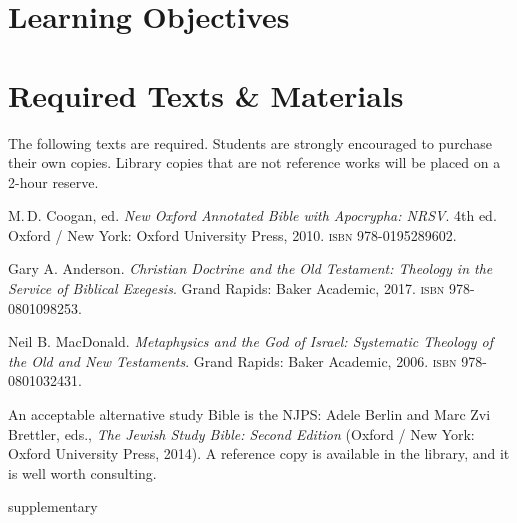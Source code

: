 \documentclass[titlepage]{article}
\newcommand\incl{../includes}
\begin{document}


\section{Learning Objectives}
\label{objectives}
\edobject

\section{Required Texts \& Materials}
\label{texts}

The following texts are required. Students are strongly encouraged to
purchase their own copies. Library copies that are not reference works
will be placed on a 2-hour reserve.

\begingroup
\renewcommand{\section}[2]{}%
\begin{thebibliography}{MacDonald}%

	 M.\,D. Coogan, ed.
    \emph{New Oxford Annotated Bible with Apocrypha: NRSV}. 4th ed.
    Oxford / New York: Oxford University Press, 2010.
    \textsc{isbn} 978-0195289602.

	 Gary A. Anderson.
	\emph{Christian Doctrine and the Old Testament: Theology in the Service of Biblical Exegesis}.
	Grand Rapids: Baker Academic, 2017.
	\textsc{isbn} 978-0801098253.

	 Neil B. MacDonald.
	\emph{Metaphysics and the God of Israel: Systematic Theology of the Old and New Testaments}.
	Grand Rapids: Baker Academic, 2006.
	\textsc{isbn} 978-0801032431.


\end{thebibliography}
\endgroup

An acceptable alternative study Bible is the NJPS: Adele Berlin and Marc
Zvi Brettler, eds., \emph{The Jewish Study Bible: Second Edition}
(Oxford / New York: Oxford University Press, 2014). A reference copy is
available in the library, and it is well worth consulting.

\section{Supplementary Texts}
\label{supplementary}
\end{document}
